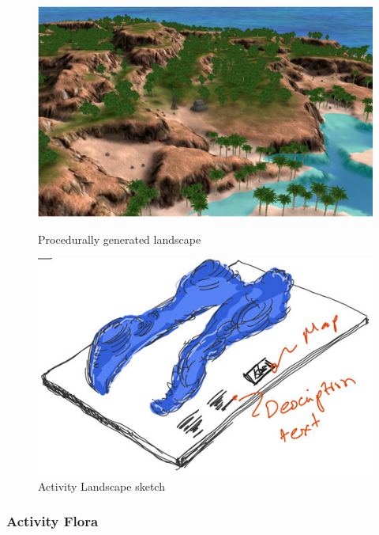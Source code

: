 \documentclass[../medieninformatik-arbeit.tex]{subfiles}
\begin{document}
\begin{figure}[h]
\centering
\begin{minipage}{.45\textwidth}
\centering
	\includegraphics[width=\linewidth]{Prototype/img/terrain}
	\caption{Procedurally generated landscape \cite{olsen2004realtime}}
	\label{fig:proceduralterr}
\end{minipage}
\begin{minipage}{.45\textwidth}
\centering
  \includegraphics[width=0.88\linewidth]{Prototype/img/ActivityLandscape_detail}
  \caption{Activity Landscape sketch}
  \label{fig:activitylandscape}
\end{minipage}
\end{figure}


\subsubsection{Activity Flora}
\end{document}
